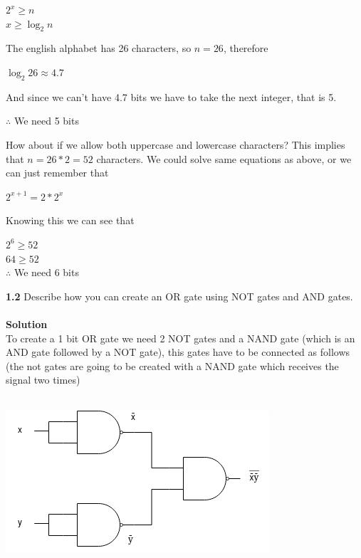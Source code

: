\documentclass{article}
\begin{document}
\begin{center}
$2^x \geq n$\\
$x \geq \log_2 n$\\
\end{center}
The english alphabet has 26 characters, so $n=26$, therefore\\
\begin{center}
$\log_2 26 \approx 4.7$
\end{center}
And since we can't  have 4.7 bits we have to take the next integer, that is 5.\\
\begin{center}
$\therefore{}$ We need 5 bits
\end{center}
How about if we allow both uppercase and lowercase characters? This implies that $n=26 * 2 = 52$ characters. We could solve same equations as above, or we can just remember that\\
\begin{center}
$2^{x + 1} = 2 * 2^x$
\end{center}
Knowing this we can see that\\
\begin{center}
$2^6 \geq 52$\\
$64 \geq 52$\\
$\therefore{}$ We need 6 bits
\end{center}
\textbf{1.2} Describe how you can create an OR gate using NOT gates and AND gates.\\ \\
\textbf{Solution}\\
To create a 1 bit OR gate we need 2 NOT gates and a NAND gate (which is an AND gate followed by a NOT gate), this gates have to be connected as follows (the not gates are going to be created with a NAND gate which receives the signal two times)\\ \\
\begin{center}
\includegraphics[scale = 0.75]{or using nands.png}
\end{center}
\end{document}
